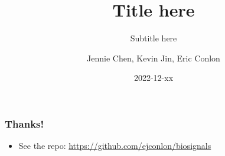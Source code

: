 \documentclass[12pt,aspectratio=169]{beamer}
\title{Title here}
\subtitle{Subtitle here}
\author{Jennie Chen, Kevin Jin, Eric Conlon}
\date{2022-12-xx}
\begin{document}
\frame{\titlepage}

\begin{frame}
\frametitle{Thanks!}
\begin{itemize}
  \item See the repo: \url{https://github.com/ejconlon/biosignals}
\end{itemize}
\end{frame}
\end{document}
